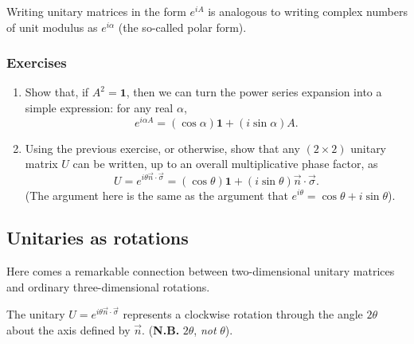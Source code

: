 \documentclass[fleqn]{article}
\providecommand{\tightlist}{%
  \setlength{\itemsep}{0pt}\setlength{\parskip}{0pt}}
\newenvironment{idea}{\noindent}{\medskip}
\begin{document}
\begin{idea}

Writing unitary matrices in the form \(e^{iA}\) is analogous to writing complex numbers of unit modulus as \(e^{i\alpha}\) (the so-called polar form).

\end{idea}

\hypertarget{exercises-2}{%
\subsubsection{Exercises}\label{exercises-2}}

\begin{enumerate}
\def\labelenumi{\arabic{enumi}.}
\tightlist
\item
  Show that, if \(A^2=\mathbf{1}\), then we can turn the power series expansion into a simple expression: for any real \(\alpha\),
  \[
     e^{i\alpha A}
     = (\cos\alpha)\mathbf{1}+ (i\sin\alpha)A.
   \]
\item
  Using the previous exercise, or otherwise, show that any \((2\times 2)\) unitary matrix \(U\) can be written, up to an overall multiplicative phase factor, as
  \[
     U
     = e^{i \theta \vec{n}\cdot\vec{\sigma}}
     = (\cos\theta)\mathbf{1}+ (i\sin\theta)\vec{n}\cdot\vec{\sigma}.
   \]
  (The argument here is the same as the argument that \(e^{i\theta}=\cos\theta +i\sin\theta\)).
\end{enumerate}

\hypertarget{unitaries-as-rotations}{%
\subsection{Unitaries as rotations}\label{unitaries-as-rotations}}

Here comes a remarkable connection between two-dimensional unitary matrices and ordinary three-dimensional rotations.

\begin{idea}

The unitary \(U = e^{i\theta \vec{n}\cdot\vec{\sigma}}\) represents a clockwise rotation through the angle \(2\theta\) about the axis defined by \(\vec{n}\).
(\textbf{N.B.} \(2\theta\), \emph{not} \(\theta\)).

\end{idea}
\end{document}

